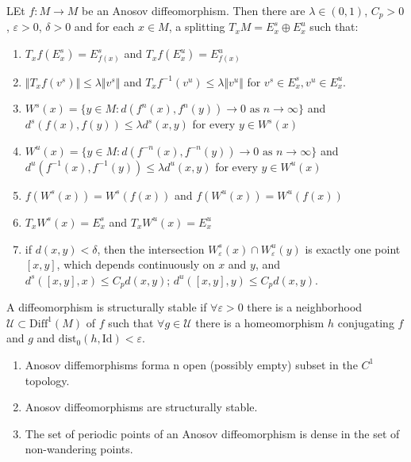 \begin{prop}

LEt $f:M \to M$ be an Anosov diffeomorphism. Then there are $\lambda \in (0,1)$, $C_p > 0$, $\varepsilon > 0$, $\delta > 0$ and for each $x \in M$, a splitting $T_xM = E^s_x \oplus E^u_x$ such that:

\begin{enumerate}
    \item $T_x f (E^s_x) = E^s_{f(x)}$ and $T_xf (E^u_x) = E^u_{f(x)}$
    \item $\Vert T_xf (v^s) \Vert \leq \lambda \Vert v^s \Vert $ and $T_xf^{-1}(v^u) \leq \lambda \Vert v^u \Vert$ for $v^s \in E^s_x, v^u \in E^u_x$.
    \item $W^s(x) = \{ y \in M: d(f^n(x), f^n(y)) \to 0 \text{ as } n \to \infty \}$ and $d^s(f(x),f(y)) \leq \lambda d^s(x,y)$ for every $y \in W^s(x)$
    \item $W^u(x) = \{ y \in M: d(f^{-n}(x), f^{-n}(y)) \to 0 \text{ as } n \to \infty \}$ and $d^u(f^{-1}(x), f^{-1}(y)) \leq \lambda d^u(x,y)$ for every $y \in W^u(x)$
    \item $f(W^s(x)) = W^s(f(x))$ and $f(W^u(x)) = W^u(f(x))$
    \item $T_xW^s(x) = E^s_x$ and $T_x W^u(x)=E^u_x$
    \item if $d(x,y) < \delta$, then the intersection $W^s_{\varepsilon}(x) \cap W^u_{\varepsilon}(y)$ is exactly one point $[x,y]$, which depends continuously on $x$ and $y$, and $d^s([x,y],x) \leq C_p d(x,y)$; $d^u([x,y],y) \leq C_p d(x,y)$.
\end{enumerate}
\end{prop}

\indent A diffeomorphism is structurally stable if $\forall \varepsilon > 0$ there is a neighborhood $\mathcal{U}\subset \mathrm{Diff}^1(M)$ of $f$ such that $\forall g \in \mathcal{U}$ there is a homeomorphism $h$ conjugating $f$ and $g$ and $\mathrm{dist}_0(h,\mathrm{Id}) < \varepsilon$.

\begin{prop}
\begin{enumerate}
    \item Anosov diffemorphisms forma n open (possibly empty) subset in the $C^1$ topology.
    \item Anosov diffeomorphisms are structurally stable.
    \item The set of periodic points of an Anosov diffeomorphism is dense in the set of non-wandering points.
\end{enumerate}
\end{prop}


